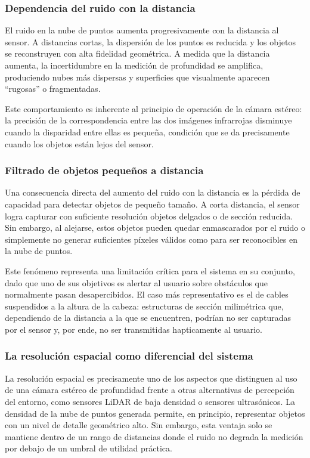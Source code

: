 \subsubsection{Dependencia del ruido con la distancia}

El ruido en la nube de puntos aumenta progresivamente con la distancia al
sensor. A distancias cortas, la dispersión de los puntos es reducida y los
objetos se reconstruyen con alta fidelidad geométrica. A medida que la
distancia aumenta, la incertidumbre en la medición de profundidad se amplifica,
produciendo nubes más dispersas y superficies que visualmente aparecen
``rugosas'' o fragmentadas.

Este comportamiento es inherente al principio de operación de la cámara
estéreo: la precisión de la correspondencia entre las dos imágenes infrarrojas
disminuye cuando la disparidad entre ellas es pequeña, condición que se da
precisamente cuando los objetos están lejos del sensor.

\subsubsection{Filtrado de objetos pequeños a distancia}

Una consecuencia directa del aumento del ruido con la distancia es la pérdida
de capacidad para detectar objetos de pequeño tamaño. A corta distancia, el
sensor logra capturar con suficiente resolución objetos delgados o de sección
reducida. Sin embargo, al alejarse, estos objetos pueden quedar enmascarados
por el ruido o simplemente no generar suficientes píxeles válidos como para
ser reconocibles en la nube de puntos.

Este fenómeno representa una limitación crítica para el sistema en su conjunto,
dado que uno de sus objetivos es alertar al usuario sobre obstáculos que
normalmente pasan desapercibidos. El caso más representativo es el de cables
suspendidos a la altura de la cabeza: estructuras de sección milimétrica que,
dependiendo de la distancia a la que se encuentren, podrían no ser capturadas
por el sensor y, por ende, no ser transmitidas hapticamente al usuario.

\subsubsection{La resolución espacial como diferencial del sistema}

La resolución espacial es precisamente uno de los aspectos que distinguen al
uso de una cámara estéreo de profundidad frente a otras alternativas de
percepción del entorno, como sensores LiDAR de baja densidad o sensores
ultrasónicos. La densidad de la nube de puntos generada permite, en principio,
representar objetos con un nivel de detalle geométrico alto. Sin embargo, esta
ventaja solo se mantiene dentro de un rango de distancias donde el ruido no
degrada la medición por debajo de un umbral de utilidad práctica.

